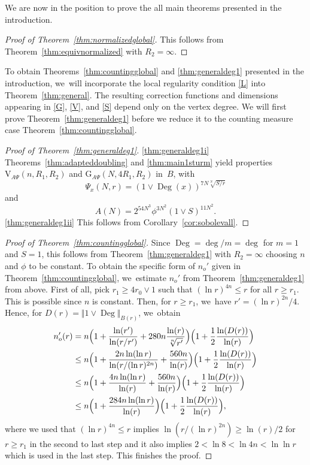 \documentclass[JEP,XML,SOM,Unicode,published]{cedram}
\newcommand{\rG}{\mathrm{G}}
\newcommand{\rV}{\mathrm{V}}
\theoremstyle{plain}
\theoremstyle{definition}
\DeclareMathOperator{\Deg}{Deg}
\begin{document}
We are now in the position to prove the all main theorems presented in the introduction.
\begin{proof}[Proof of Theorem~\ref{thm:normalizedglobal}]
This follows from Theorem~\ref{thm:equivnormalized} with $R_2=\infty$.
\end{proof}

To obtain Theorems~\ref{thm:countingglobal} and \ref{thm:generaldeg1} presented in the introduction, we~will incorporate the local regularity condition \eqref{L} into Theorem~\ref{thm:general}. The resulting correction functions and dimensions appearing in \eqref{G}, \eqref{V}, and \eqref{S} depend only on the vertex degree.
We will first prove Theorem~\ref{thm:generaldeg1} before we reduce it to the counting measure case Theorem~\ref{thm:countingglobal}.

\skpt
\begin{proof}[Proof of Theorem~\ref{thm:generaldeg1}]
\par
\eqref{thm:generaldeg1i}
Theorems~\ref{thm:adapteddoubling} and \ref{thm:main1sturm} yield properties $\rV_{\!A\Psi}(n,R_1,R_2)$ and $\rG_{A \Psi}(N,4R_1,R_2)$ in~$B$, with
\[
\Psi_x(N,r)
=\left(1\vee\Deg(x)\right)^{7N\sqrt[N]{S/r}}
\]
and
\[
A(N)
=2^{54N^3}\phi^{3N^2}(1\vee S)^{11N^2}.
\]
\eqref{thm:generaldeg1ii}
This follows from Corollary~\ref{cor:sobolevall}.
\end{proof}

\begin{proof}[Proof of Theorem~\ref{thm:countingglobal}] Since $ \Deg=\deg/m =\deg$ for $ m=1 $ and $S=1$, this follows from {Theorem~\ref{thm:generaldeg1} with $R_2=\infty$ choosing $ n $ and $ \phi $ to be constant}. To obtain the specific form of $ n_o' $ given in Theorem~\ref{thm:countingglobal}, we~estimate $ n_o' $ from Theorem~\ref{thm:generaldeg1} from above. First of all, pick
$r_1\ge 4r_0 \vee 1$ such that $(\ln r)^{4n} \le r$ for all $r\ge r_1$. This is possible since $n$ is constant. Then, for $r\ge r_1$, we~have $r'= (\ln r)^{2n}/4$. Hence, for $D(r)=\Vert 1\vee \Deg\Vert_{B(r)}$, we~obtain
\begin{align*}
n_o'(r)&=
n \Bigl(1+\frac{\ln(r')}{\ln(r/r')} +{280 n{\frac{\ln (r)}{\sqrt[ n]{r'}}}}\Bigr)\Bigl(1+ \frac{1}{2}\frac{\ln (D(r))} {\ln (r)}\Bigr)\\
&\le n \Bigl(1+\frac{2n \ln(\ln r) }{\ln(r / (\ln r)^{2n}) } +\frac{560 n}{\ln (r)}\Bigr)\Bigl(1+ \frac{1}{2}\frac{\ln (D(r))} {\ln (r)}\Bigr)\\
&\le n \Bigl(1+\frac{4n \ln(\ln r) }{\ln(r) } +\frac{560 n}{\ln (r)}\Bigr)\Bigl(1+ \frac{1}{2}\frac{\ln (D(r))} {\ln (r)}\Bigr)\\
&\le n \Bigl(1+\frac{284n \ln(\ln r) }{\ln(r) } \Bigr)\Bigl(1+ \frac{1}{2}\frac{\ln (D(r))} {\ln (r)}\Bigr),
\end{align*}
where we used that $(\ln r)^{4n} \le r$ implies $\ln(r/( \ln r)^{2n})\ge \ln(r)/2$ for $r\ge r_1$ in the second to last step and it also implies $2<\ln 8< \ln 4n <\ln \ln r$ which is used in the last step. This finishes the proof.
\end{proof}




\end{document}
